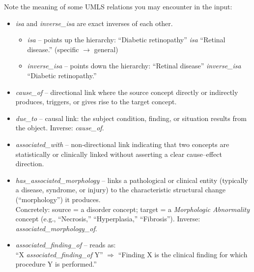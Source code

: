 \documentclass[10pt]{article}
\begin{document}
\begin{appendices}
\begin{tcolorbox}
Note the meaning of some UMLS relations you may encounter in the input:\\
\begin{itemize}
  \item \textit{isa} and \textit{inverse\_isa} are exact inverses of each other.
    \begin{itemize}
      \item \textit{isa} – points up the hierarchy: ``Diabetic retinopathy'' \textit{isa} ``Retinal disease.'' (specific $\to$ general)
      \item \textit{inverse\_isa} – points down the hierarchy: ``Retinal disease'' \textit{inverse\_isa} ``Diabetic retinopathy.''
    \end{itemize}
  \item \textit{cause\_of} – directional link where the source concept directly or indirectly produces, triggers, or gives rise to the target concept.
  \item \textit{due\_to} – causal link: the subject condition, finding, or situation results from the object. Inverse: \textit{cause\_of}.
  \item \textit{associated\_with} – non‐directional link indicating that two concepts are statistically or clinically linked without asserting a clear cause–effect direction.
  \item \textit{has\_associated\_morphology} – links a pathological or clinical entity (typically a disease, syndrome, or injury) to the characteristic structural change (``morphology'') it produces.\\
  Concretely: source = a disorder concept; target = a \emph{Morphologic Abnormality} concept (e.g., ``Necrosis,'' ``Hyperplasia,'' ``Fibrosis''). Inverse: \textit{associated\_morphology\_of}.
  \item \textit{associated\_finding\_of} – reads as: \\
    ``X \textit{associated\_finding\_of} Y'' $\Rightarrow$ ``Finding X is the clinical finding for which procedure Y is performed.''
\end{itemize}

\end{tcolorbox}



\end{appendices}
\end{document}
